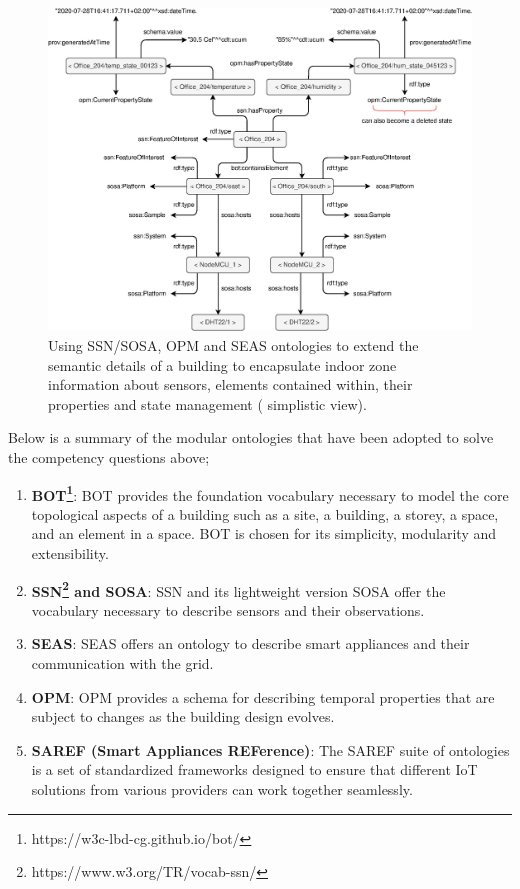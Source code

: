 \begin{figure}[htbp]
    \centering
    \includegraphics[width=1\textwidth]{figures/SSN_OPM_SEAS.eps}
    \caption{Using SSN/SOSA, OPM and SEAS ontologies to extend the semantic details of a building to encapsulate indoor zone information about sensors, elements contained within, their properties and state management ( simplistic view).} \label{SSN_OPM_SEAS}
\end{figure}

Below is a summary of the modular ontologies that have been adopted to solve the competency questions above;
\begin{enumerate}
    \item 
    \textbf{\acf{BOT}\footnote{https://w3c-lbd-cg.github.io/bot/}}: \ac{BOT} \citep{Rasmussen2017} provides the foundation vocabulary necessary to model the core topological aspects of a building such as a site, a building, a storey, a space, and an element in a space. \ac{BOT} is chosen for its simplicity, modularity and extensibility.

    \item 
    \textbf{\acf{SSN}\footnote{https://www.w3.org/TR/vocab-ssn/} and \acf{SOSA}}: \ac{SSN} and its lightweight version \ac{SOSA} \citep{Haller2017} offer the vocabulary necessary to describe sensors and their observations.

    \item
    \textbf{\ac{SEAS}}: \ac{SEAS} \citep{Lefrancois2016} offers an ontology to describe smart appliances and their communication with the grid.

    \item 
    \textbf{\ac{OPM}}: \ac{OPM} \citep{Rasmussen2018a} provides a schema for describing temporal properties that are subject to changes as the building design evolves.

    \item 
    \textbf{SAREF (Smart Appliances REFerence)}: The \ac{SAREF} \citep{Daniele2015} suite of ontologies is a set of standardized frameworks designed to ensure that different \ac{IoT} solutions from various providers can work together seamlessly.
\end{enumerate}

